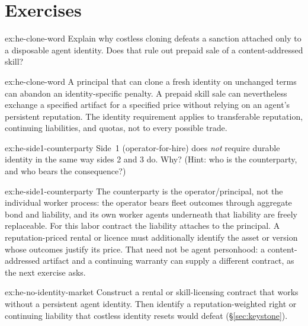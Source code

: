 \documentclass[11pt,a4paper]{article}
\theoremstyle{definition}
\theoremstyle{definition}
\theoremstyle{remark}
\begin{document}
\section{Exercises}
\label{sec:he-exercises}


\begin{pdexercise}[kind=Check,rating=1]{ex:he-clone-word}
Explain why costless cloning defeats a sanction attached only to a disposable
agent identity. Does that rule out prepaid sale of a content-addressed skill?
\end{pdexercise}
\begin{pdsolution}{ex:he-clone-word}
A principal that can clone a fresh identity on unchanged terms can abandon an
identity-specific penalty. A prepaid skill sale can nevertheless exchange a
specified artifact for a specified price without relying on an agent's persistent
reputation. The identity requirement applies to transferable reputation,
continuing liabilities, and quotas, not to every possible trade.
\end{pdsolution}
\begin{pdexercise}[kind=Check,rating=1]{ex:he-side1-counterparty}
Side~1 (operator-for-hire) does \emph{not} require durable identity in the
  same way sides 2 and 3 do. Why? (Hint: who is the counterparty, and who bears
  the consequence?)
\end{pdexercise}
\begin{pdsolution}{ex:he-side1-counterparty}
The counterparty is the operator/principal, not the individual worker
process: the operator bears fleet outcomes through aggregate bond and liability,
and its own worker agents underneath that liability are freely replaceable.
For this labor contract the liability attaches to the principal. A
reputation-priced rental or licence must additionally identify the asset or
version whose outcomes justify its price. That need not be agent personhood:
a content-addressed artifact and a continuing warranty can supply a different
contract, as the next exercise asks.
\end{pdsolution}
\begin{pdexercise}[kind=Open,rating=3]{ex:he-no-identity-market}
Construct a rental or skill-licensing contract that works without a persistent
agent identity. Then identify a reputation-weighted right or continuing liability
that costless identity resets would defeat (\S\ref{sec:keystone}).
\end{pdexercise}
\end{document}
